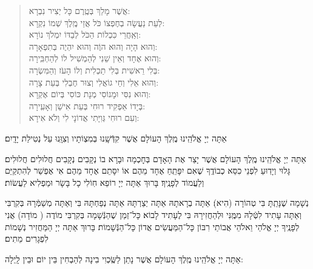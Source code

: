 \documentclass[twoside, openany, parskip=half, 11pt]{book}
\begin{document}
\begin{quote}

אֲשֶׁר מָלַךְ \hfill 	בְּטֶֽרֶם כָּל	יְצִיר נִבְרָא: \\
לְעֵת נַעֲשָׂה בְחֶפְצוֹ כֹּל \hfill אֲזַי מֶֽלֶךְ שְׁמוֹ נִקְרָא:\\
וְאַֽחֲרֵי כִּכְלוֹת הַכֹּל \hfill לְבַדּוֹ יִמְלֹךְ נוֹרָא: \\
וְהוּא הָיָה וְהוּא הוֶֹה \hfill 	וְהוּא יִהְיֶה בְּתִפְאָרָה: \\
וְהוּא אֶחָד וְאֵין שֵׁנִי \hfill לְהַמְשִׁיל לוֹ לְהַחְבִּֽירָה: \\
בְּלִי רֵאשִׁית בְּלִי תַכְלִית \hfill וְלוֹ הָעֹז וְהַמִּשְׂרָה: \\
וְהוּא אֵלִי וְחַי גוֹאֲלִי \hfill וְצוּר חֶבְלִי בְּעֵת צָרָה: \\
וְהוּא נִסִּי  וּמָנוֹסִי \hfill מְנָת כּוֹסִי בְּיוֹם אֶקְרָא: \\
בְּיָדוֹ אַפְקִיד רוּחִי \hfill בְּעֵת אִישַׁן וְאָעִֽירָה: \\
וְעִם רוּחִי גְּוִיָּתִי \hfill אֲדוֹנָי לִי וְלֹא אִירָא:

\end{quote}

 אַתָּה יְיָ אֱלֹהֵֽינוּ מֶֽלֶךְ הָעוֹלָם אֲשֶׁר קִדְּֿשָֽׁנוּ בְּמִצְוֹתָיו וְצִוָּֽנוּ עַל נְטִילַת יָדָֽיִם׃
 
	 אַתָּה יְיָ אֱלֹהֵֽינוּ מֶֽלֶךְ הָעוֹלָם אֲשֶׁר יָצַר אֶת הָאָדָם בְּחׇכְמָה וּבָרָא בוֹ נְקָבִים נְקָבִים חֲלוּלִים חֲלוּלִים׃ גָּלוּי וְיָדֽוּעַ לִפְנֵי כִסֵּא כְבוֹדֶֽךָ שֶׁאִם יִפָּתֵֽחַ אֶחָד מֵהֶם אוֹ יִסָּתֵם אֶחָד מֵהֶם אִי אֶפְשַׁר לְהִתְקַיֵּם וְלַעֲמוֹד לְפָנֶֽיךָ׃ בָּרוּךְ אַתָּה יְיָ רוֹפֵא חֽוֹלִי כָל בָּשָׂר וּמַפְלִיא לַעֲשׂוֹת׃


נְשָׁמָה שֶׁנָּתַֽתָּ בִּי טְהוֹרָה (הִיא)׃ אַתָּה בְרָאתָהּ אַתָּה יְצַרְתָּהּ אַתָּה נְפַחְתָּהּ בִּי וְאַתָּה מְשַׁמְּֿרָהּ בְּקִרְבִּי וְאַתָּה עָתִיד לִטְּֿלָהּ מִמֶּֽנִּי וּלְהַחֲזִירָהּ בִּי לֶעָתִיד לָבוֹא׃ כָּל־זְמַן שֶׁהַנְּֿשָׁמָה בְּקִרְבִּי מוֹדֶה (
מוֹדָה) אֲנִי לְפָנֶֽיךָ יְיָ אֱלֹהַי וֵאלֹהֵי אֲבוֹתַי רִבּוֹן כָּל־הַמַּעֲשִׂים אֲדוֹן כָּל־הַנְּֿשָׁמוֹת׃ בָּרוּךְ אַתָּה יְיָ הַמַּחֲזִיר נְשָׁמוֹת לִפְגָרִים מֵתִים׃


אַתָּה יְיָ אֱלֹהֵֽינוּ מֶֽלֶךְ הָעוֹלָם אֲשֶׁר נָתַן לַשֶּֽׂכְוִי בִינָה לְהַבְחִין בֵּין יוֹם וּבֵין לָֽיְלָה:
\end{document}
